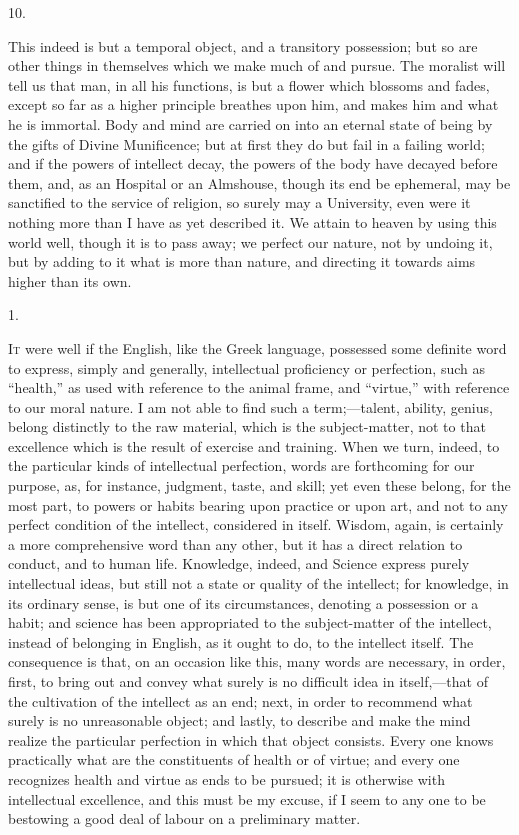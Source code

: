 10.

This indeed is but a temporal object, and a transitory possession;
but so are other things in themselves which we make much of and
pursue. The moralist will tell us that man, in all his functions, is
but a flower which blossoms and fades, except so far as a higher
principle breathes upon him, and makes him and what he is immortal.
Body and mind are carried on into an eternal state of being by the
gifts of Divine Munificence; but at first they do but fail in a
failing world; and if the powers of intellect decay, the powers of the
body have decayed before them, and, as an Hospital or an Almshouse,
though its end be ephemeral, may be sanctified to the service of
religion, so surely may a University, even were it nothing more than I
have as yet described it. We attain to heaven by using this world
well, though it is to pass away; we perfect our nature, not by undoing
it, but by adding to it what is more than nature, and directing it
towards aims higher than its own.


1.

I\textsc{t} were well if the English, like the Greek language,
possessed some definite word to express, simply and generally,
intellectual proficiency or perfection, such as ``health,'' as
used with reference to the animal frame, and ``virtue,'' with
reference to our moral nature. I am not able to find such a term;—talent,
ability, genius, belong distinctly to the raw material, which is the
subject-matter, not to that excellence which is the result of exercise
and training. When we turn, indeed, to the particular kinds of
intellectual perfection, words are forthcoming for our purpose, as,
for instance, judgment, taste, and skill; yet even these belong, for
the most part, to powers or habits bearing upon practice or upon art,
and not to any perfect condition of the intellect, considered in
itself. Wisdom, again, is certainly a more comprehensive word than any
other, but it has a direct relation to conduct, and to human life.
Knowledge, indeed, and Science express purely intellectual ideas, but
still not a state or quality of the intellect; for knowledge, in its
ordinary sense, is but one of its circumstances, denoting a possession
or a habit; and science has been appropriated to the subject-matter of
the intellect, instead of belonging in English, as it ought to do, to
the intellect itself. The consequence is that, on an occasion
like this, many words are necessary, in order, first, to bring out and
convey what surely is no difficult idea in itself,—that of the
cultivation of the intellect as an end; next, in order to recommend
what surely is no unreasonable object; and lastly, to describe and
make the mind realize the particular perfection in which that object
consists. Every one knows practically what are the constituents of
health or of virtue; and every one recognizes health and virtue as
ends to be pursued; it is otherwise with intellectual excellence, and
this must be my excuse, if I seem to any one to be bestowing a good
deal of labour on a preliminary matter.

